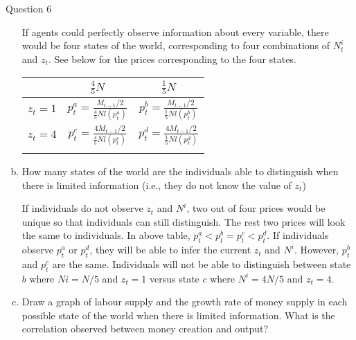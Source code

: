 \documentclass[a4paper]{article}
\newif\IfInSansMode
\numberwithin{equation}{section}
\numberwithin{figure}{section}
\begin{document}
\begin{questionbox}{Question 6}
\begin{enumerate}[(a), resume]
			\begin{explanationbox}
				If agents could perfectly observe information about every variable, there would be four states of the world, corresponding to four combinations of \(N_t^i\) and \(z_t\). See below for the prices corresponding to the four states.
				\begin{table}[H]
					\centering
					\renewcommand{\arraystretch}{1.5}
					\begin{tabular}{c|cc} \hhline{===}
						& \( \frac{4}{5} N \) & \( \frac{1}{5} N \) \\ \hline
						\( z_t = 1 \) & \( p_t^a = \frac{M_{t-1} / 2}{\frac{4}{5} N l (p_t^a)} \) & \( p_t^b = \frac{M_{t-1} / 2}{\frac{1}{5} N l (p_t^b)} \) \\
						\( z_t = 4 \) & \( p_t^c = \frac{4M_{t-1} / 2}{\frac{4}{5} N l (p_t^c)} \) & \( p_t^d = \frac{4M_{t-1} / 2}{\frac{1}{5} N l (p_t^d)} \) \\ [3pt] \hhline{===}
					\end{tabular}
				\end{table}
			\end{explanationbox}
			\item How many states of the world are the individuals able to distinguish when there is limited information (i.e., they do not know the value of \( z_t \))
			\begin{explanationbox}
				If individuals do not observe \(z_t\) and \(N^i\), two out of four prices would be unique so that individuals can still distinguish. The rest two prices will look the same to individuals. In above table, \(p_t^a < p_t^b = p_t^c < p_t^d\). If individuals observe \(p_t^a\) or \(p_t^d\), they will be able to infer the current \(z_t\) and \(N^i\). However, \(p_t^b\) and \(p_t^c\) are the same. Individuals will not be able to distinguish between state \(b\) where \(Ni = N/5\) and \(z_t = 1\) versus state \(c\) where \(N^i = 4N/5\) and \(z_t = 4\).
			\end{explanationbox}
			\item Draw a graph of labour supply and the growth rate of money supply in each possible state of the world when there is limited information. What is the correlation observed between money creation and output?
			\begin{explanationbox}

\end{explanationbox}
\end{enumerate}
\end{questionbox}
\end{document}
